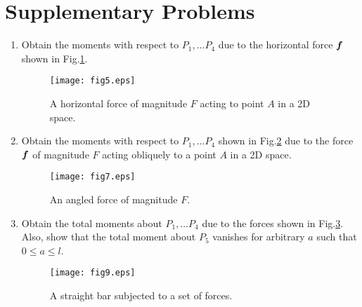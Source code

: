 \documentclass[10pt,a4j]{article}
\begin{document}
\section{Supplementary Problems}
\begin{enumerate}
\item
	Obtain the moments with respect to $P_1,\dots P_4$ 
	due to the horizontal force $\mbox{\boldmath $f$}$ shown in Fig.\ref{fig:fig5}.
	\begin{figure}[h]
		\begin{center}
		\texttt{[image: fig5.eps]} 
		\end{center}
		\caption{A horizontal force of magnitude $F$ acting to point $A$ 
		in a 2D space.} 
		\label{fig:fig5}
	\end{figure}
\item
	Obtain the moments with respect to $P_1,\dots P_4$ shown in Fig.\ref{fig:fig7} 
	due to the force $\mbox{\boldmath $f$}$ of magnitude $F$ acting obliquely to 
	a point $A$ in a 2D space.
	\begin{figure}[h]
		\begin{center}
		\texttt{[image: fig7.eps]} 
		\end{center}
		\caption{An angled  force of magnitude $F$.} 
		\label{fig:fig7}
	\end{figure}
\item
	Obtain the total moments about $P_1,\dots P_4$ due to the 
	forces shown in Fig.\ref{fig:fig9}. Also, show that the total moment about 
	$P_5$ vanishes for arbitrary $a$ such that $0\leq a \leq l$.
	\begin{figure}[h]
		\begin{center}
		\texttt{[image: fig9.eps]} 
		\end{center}
		\caption{A straight bar subjected to a set of forces.} 
		\label{fig:fig9}
	\end{figure}
\end{enumerate}
\end{document}
